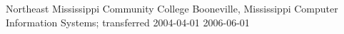 \educationitem
    {Northeast Mississippi Community College}
    {Booneville, Mississippi}
    {Computer Information Systems; transferred}
    {2004-04-01}
    {2006-06-01}